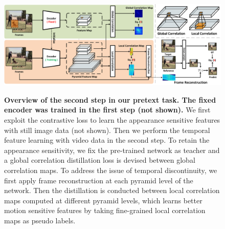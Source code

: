 \documentclass{article}
\begin{document}
\begin{figure}[!tb]
  \centering
  {\includegraphics[width=1.0\textwidth]{figure/framework/framework.pdf}}
  \caption{\small \textbf{Overview of the second step in our pretext task. The fixed encoder was trained in the first step (not shown).} We first exploit the contrastive loss to learn the appearance sensitive features with still image data (not shown). Then we perform the temporal feature learning with video data in the second step. To retain the appearance sensitivity, we fix the pre-trained network as teacher and a global correlation distillation loss is devised between global correlation maps. To address the issue of temporal discontinuity, we first apply frame reconstruction at each pyramid level of the network. Then the distillation is conducted between local correlation maps computed at different pyramid levels, which learns better motion sensitive features by taking fine-grained local correlation maps as pseudo labels. }
  \label{fig:framework}
  \vspace{-5mm}
\end{figure}
\end{document}
